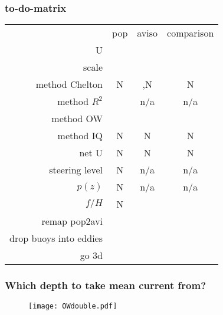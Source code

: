 
\newcommand{\cg}[1]{\cellcolor{green!25}#1}
\newcommand{\ce}[1]{\cellcolor{red!25}#1}
\newcommand{\cb}[1]{\cellcolor{gray!25}#1}
\newcommand{\n}{n/a}
\newcommand{\citeP}{\cite{Petersen2013}}
\newcommand{\citeCs}{\cite{Chelton2007}}
\newcommand{\citeCe}{\cite{Chelton2011}}
\newcommand{\citeCes}{\cite{Chelton2011,Chelton2007}}
\begin{frame}
 \frametitle{to-do-matrix}
 \begin{small} 
\begin{tabular}{r|c|c|c|}
\multicolumn{1}{c}{}	& \multicolumn{1}{c}{pop}	&	\multicolumn{1}{c}{aviso}	&	\multicolumn{1}{c}{comparison}\\
\cline{2-4}
U						&	\cg{\citeP}				&		\cg{\citeCes}			&		\cg{\citeP}	\\
\cline{2-4}
scale					&	\cg{\citeP}				&		\cg{\citeCes}			&		\cg{\citeP}	\\
\cline{2-4}
method Chelton			&	\ce{N}					&		\cg{\citeCe,N}			&		\ce{N}	\\
\cline{2-4}
method $R^2$			&	\cg{\citeP}				&		\cb{\n}					&		\cb{\n}	\\
\cline{2-4}
method OW				&	\cg{\citeP}				&		\cg{\citeCs}			&		\cg{\citeP}	\\
\cline{2-4}
method IQ				&	\ce{N}					&		\ce{N}					&		\ce{N}	\\
\cline{2-4}
net U					&	\ce{N}					&		\ce{N}					&		\ce{N}	\\
\cline{2-4}
steering level			&	\ce{N}					&		\cb{\n}					&		\cb{\n}	\\
\cline{2-4}
$p(z)$					&	\ce{N}					&		\cb{\n}					&		\cb{\n}	\\
\cline{2-4}
$f/H$					&	\ce{N}					&		\ce{ }					&		\ce{ }	\\
\cline{2-4}
remap pop2avi
&	\ce{ }					&		\ce{ }					&		\ce{ }	\\
\cline{2-4}
drop buoys into eddies
&	\ce{ }					&		\ce{ }					&		\ce{ }	\\
\cline{2-4}
go 3d
&	\ce{ }					&		\ce{ }					&		\ce{ }	\\
\cline{2-4}
\end{tabular}
\end{small}
\begin{tiny}


%
\end{tiny}
\end{frame}


%
%


\begin{frame}
\frametitle{Which depth to take mean current from?}
\begin{figure}
	\centering
\texttt{[image: OWdouble.pdf]}
\end{figure}
\end{frame}






